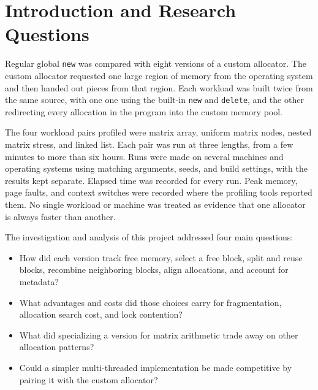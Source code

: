 \section{Introduction and Research Questions}
\label{sec:introduction}

Regular global \texttt{new} was compared with eight versions of a custom
allocator.
The custom allocator requested one large region of memory from the operating
system and then handed out pieces from that region.
Each workload was built twice from the same source, with one
one using the built-in \texttt{new} and \texttt{delete}, and 
the other redirecting every allocation in the program into the custom memory pool.

The four workload pairs profiled were matrix array, uniform matrix nodes,
nested matrix stress, and linked list.
Each pair was run at three lengths, from a few minutes to more than six hours.
Runs were made on several machines and operating systems using matching
arguments, seeds, and build settings, with the results kept separate.
Elapsed time was recorded for every run.
Peak memory, page faults, and context switches were recorded where the
profiling tools reported them.
No single workload or machine was treated as evidence that one allocator is
always faster than another.

The investigation and analysis of this project addressed four main questions:

\begin{itemize}
  \item How did each version track free memory, select a free block, split and reuse
    blocks, recombine neighboring blocks, align allocations, and account for
    metadata?
  \item What advantages and costs did those choices carry for fragmentation,
    allocation search cost, and lock contention?
  \item What did specializing a version for matrix arithmetic trade away on
    other allocation patterns?
  \item Could a simpler multi-threaded implementation be made competitive by
    pairing it with the custom allocator?
\end{itemize}

